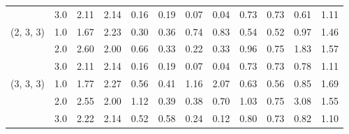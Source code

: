 \begin{tabular}{llrrrrrrrrrr}
          & 3.0 &   2.11 &  2.14 &    0.16 &  0.19 &    0.07 &  0.04 &  0.73 &  0.73 &  0.61 &  1.11 \\
(2, 3, 3) & 1.0 &   1.67 &  2.23 &    0.30 &  0.36 &    0.74 &  0.83 &  0.54 &  0.52 &  0.97 &  1.46 \\
          & 2.0 &   2.60 &  2.00 &    0.66 &  0.33 &    0.22 &  0.33 &  0.96 &  0.75 &  1.83 &  1.57 \\
          & 3.0 &   2.11 &  2.14 &    0.16 &  0.19 &    0.07 &  0.04 &  0.73 &  0.73 &  0.78 &  1.11 \\
(3, 3, 3) & 1.0 &   1.77 &  2.27 &    0.56 &  0.41 &    1.16 &  2.07 &  0.63 &  0.56 &  0.85 &  1.69 \\
          & 2.0 &   2.55 &  2.00 &    1.12 &  0.39 &    0.38 &  0.70 &  1.03 &  0.75 &  3.08 &  1.55 \\
          & 3.0 &   2.22 &  2.14 &    0.52 &  0.58 &    0.24 &  0.12 &  0.80 &  0.73 &  0.82 &  1.10 \\
\bottomrule
\end{tabular}
